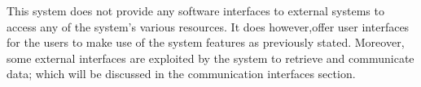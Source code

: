 This system does not provide any software interfaces to external systems to access any of the system's various resources. It does however,offer user interfaces for the users to make use of the system features as previously stated. Moreover, some external interfaces are exploited by the system to retrieve and communicate data; which will be discussed in the communication interfaces section.